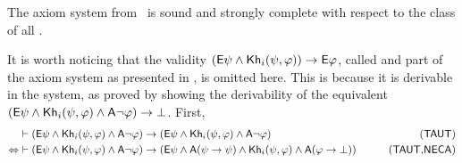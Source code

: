\medskip

\begin{theorem}\label{th:khi-completeness}
The axiom system from~ is sound and strongly complete with respect to the class of all \ultss.
\end{theorem}

\medskip

It is worth noticing that the validity $\left({\sf E}\psi \land {\sf Kh}_i(\psi,\varphi)\right) \rightarrow {\sf E}\varphi$, called  and part of the axiom system as presented in \cite{AFSVQ23report}, is omitted here. This is because it is derivable in the system, as proved by showing the derivability of the equivalent $({\sf E}\psi \wedge {\sf Kh}_i(\psi,\varphi) \wedge {\sf A}\neg\varphi) \rightarrow \bot$. First,
%
%
%
%
%
\begin{align*}
    & \vdash (\E\psi \wedge \khi(\psi,\varphi) \wedge \A\neg\varphi) \ra (\E\psi \wedge \khi(\psi,\varphi) \wedge \A\neg\varphi)    & \tag{\axm{TAUT}} \\ 
    \Leftrightarrow & \vdash (\E\psi \wedge \khi(\psi,\varphi) \wedge \A\neg\varphi) \ra (\E\psi \wedge \A(\psi \ra \psi) \wedge \khi(\psi,\varphi) \wedge \A(\varphi \ra \bot)) & \tag{\axm{TAUT},\axm{NECA}}
\end{align*}
%
%
